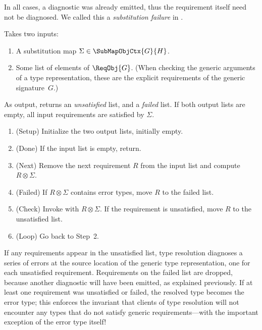 \documentclass[../generics]{subfiles}
\begin{document}
In all cases, a diagnostic was already emitted, thus the requirement itself need not be diagnosed. We called this a \emph{substitution failure} in .
\begin{algorithm}\label{check generic arguments algorithm}
Takes two inputs:
\begin{enumerate}
\item A substitution map $\Sigma\in\SubMapObjCtx{G}{H}$.
\item Some list of elements of $\ReqObj{G}$. (When checking the generic arguments of a type representation, these are the explicit requirements of the generic signature~$G$.)
\end{enumerate}
As output, returns an \emph{unsatisfied} list, and a \emph{failed} list. If both output lists are empty, all input requirements are satisfied by $\Sigma$.
\begin{enumerate}
\item (Setup) Initialize the two output lists, initially empty.
\item (Done) If the input list is empty, return.
\item (Next) Remove the next requirement $R$ from the input list and compute $R\otimes\Sigma$.
\item (Failed) If $R\otimes\Sigma$ contains error types, move $R$ to the failed list.
\item (Check) Invoke  with $R\otimes\Sigma$. If the requirement is unsatisfied, move $R$ to the unsatisfied list.
\item (Loop) Go back to Step~2.
\end{enumerate}
\end{algorithm}
If any requirements appear in the unsatisfied list, type resolution diagnoses a series of errors at the source location of the generic type representation, one for each unsatisfied requirement. Requirements on the failed list are dropped, because another diagnostic will have been emitted, as explained previously. If at least one requirement was unsatisfied or failed, the resolved type becomes the error type; this enforces the invariant that clients of type resolution will not encounter any types that do not satisfy generic requirements---with the important exception of the error type itself!
\end{document}
